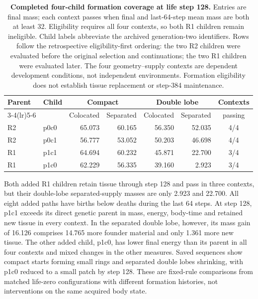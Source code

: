 \begin{table}[htbp]
\centering
\small
\setlength{\tabcolsep}{4pt}
\begin{tabular}{llrrrrc}
\toprule
Parent & Child & \multicolumn{2}{c}{Compact} & \multicolumn{2}{c}{Double lobe} & Contexts\\
\cmidrule(lr){3-4}\cmidrule(lr){5-6}
 & & Colocated & Separated & Colocated & Separated & passing\\
\midrule
R2 & p0c0 & 65.073 & 60.165 & 56.350 & 52.035 & 4/4\\
R2 & p0c1 & 56.777 & 53.052 & 50.203 & 46.698 & 4/4\\
R1 & p1c1 & 64.694 & 60.232 & 45.871 & 22.700 & 3/4\\
R1 & p1c0 & 62.229 & 56.335 & 39.160 & 2.923 & 3/4\\
\bottomrule
\end{tabular}
\caption{\textbf{Completed four-child formation coverage at life step 128.} Entries are final mass; each context passes when final and last-64-step mean mass are both at least 32. Eligibility requires all four contexts, so both R1 children remain ineligible. Child labels abbreviate the archived generation-two identifiers. Rows follow the retrospective eligibility-first ordering: the two R2 children were evaluated before the original selection and continuations; the two R1 children were evaluated later. The four geometry--supply contexts are dependent development conditions, not independent environments. Formation eligibility does not establish tissue replacement or step-384 maintenance.}
\label{tab:turnover-formation}
\end{table}

Both added R1 children retain tissue through step 128 and pass in three contexts, but their double-lobe separated-supply masses are only 2.923 and 22.700. All eight added paths have births below deaths during the last 64 steps. At step 128, p1c1 exceeds its direct genetic parent in mass, energy, body-time and retained new tissue in every context. In the separated double lobe, however, its mass gain of 16.126 comprises 14.765 more founder material and only 1.361 more new tissue. The other added child, p1c0, has lower final energy than its parent in all four contexts and mixed changes in the other measures. Saved sequences show compact starts forming small rings and separated double lobes shrinking, with p1c0 reduced to a small patch by step 128. These are fixed-rule comparisons from matched life-zero configurations with different formation histories, not interventions on the same acquired body state.


